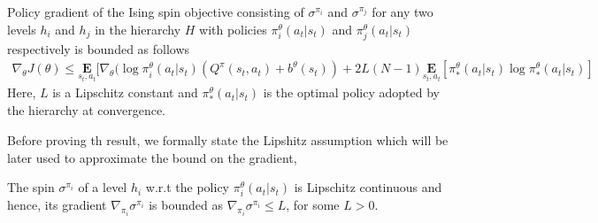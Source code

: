 \documentclass{article}
\begin{document}
\begin{prop}{4}\label{four}
    Policy gradient of the Ising spin objective consisting of $\sigma^{\pi_{i}}$  and $\sigma^{\pi_{j}}$ for any two levels $h_{i}$ and $h_{j}$ in the hierarchy $H$ with policies $\pi^{\theta}_{i}(a_{t}|s_{t})$ and $\pi^{\theta}_{j}(a_{t}|s_{t})$ respectively is bounded as follows 
    \begin{gather}
        \nabla_{\theta}J(\theta) \leq \underset{s_{t},a_{t}}{\textbf{E}}[\nabla_{\theta}(\log \pi^{\theta}_{i}(a_{t}|s_{t})(Q^{\pi}(s_{t},a_{t}) + b^{\theta}(s_{t})) + 2L(N-1)\underset{s_{t},a_{t}}{\textbf{E}}[\pi^{\theta}_{*}(a_{t}|s_{t})\log \pi^{\theta}_{*}(a_{t}|s_{t})] \nonumber
    \end{gather}
    Here, $L$ is a Lipschitz constant and $\pi^{\theta}_{*}(a_{t}|s_{t})$ is the optimal policy adopted by the hierarchy at convergence.
\end{prop}
Before proving th result, we formally state the Lipshitz assumption \cite{lipschitz} which will be later used to approximate the bound on the gradient,
\begin{assum}{1}\label{assum}
    The spin $\sigma^{\pi_{i}}$ of a level $h_{i}$ w.r.t the policy $\pi^{\theta}_{i}(a_{t}|s_{t})$ is Lipschitz continuous and hence, its gradient $\nabla_{\pi_{i}}\sigma^{\pi_{i}}$ is bounded as $\nabla_{\pi_{i}}\sigma^{\pi_{i}} \leq L$, for some $L > 0$. 
\end{assum}
\end{document}
